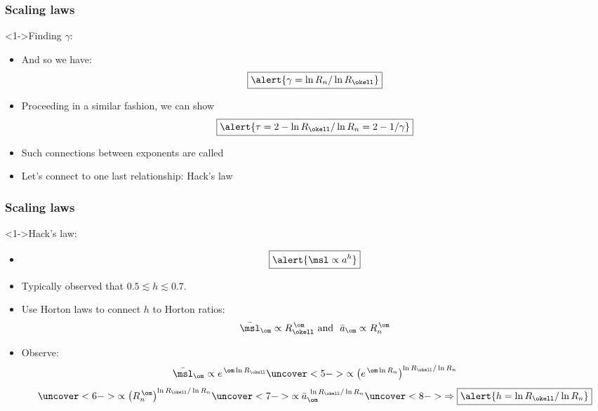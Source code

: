 \begin{frame}[label=]
  \frametitle{Scaling laws}

  \begin{block}<1->{Finding $\gamma$:}
    \begin{itemize}
    \item<1-> And so we have:
      $$
      \boxed{\alert{\gamma = \ln R_n / \ln R_\okell}}
      $$
    \item<2-> Proceeding in a similar fashion, we can
      show 
      $$
      \boxed{\alert{\tau = 2 - \ln R_\okell / \ln R_n = 2 - 1/\gamma}}
      $$
    \item<3-> Such connections between exponents are 
      called 
    \item<4-> Let's connect to one last relationship: Hack's law
    \end{itemize}
    
  \end{block}

\end{frame}

\begin{frame}[label=]
  \frametitle{Scaling laws}

  \begin{block}<1->{Hack's law:\cite{hack1957a}}
    \begin{itemize}
    \item<1-> 
      $$
      \boxed{\alert{
          \msl \propto a^{h}
        }}
      $$
    \item<2->
      Typically observed that $0.5 \lesssim h \lesssim 0.7$.
    \item<3-> Use Horton laws to connect $h$ to Horton ratios:
      $$
      \bar{\msl}_\om \propto R_\okell^{\, \om}
      \mbox{\ and \ }
      \bar{a}_\om \propto R_n^{\, \om}
      $$
    \item<4->
      Observe:
      $$
      \bar{\msl}_{\om} \propto e^{\, \om \ln R_\okell}
      \uncover<5->{
        \propto \left(e^{\, \om \ln R_n} \right)^{ \ln R_\okell / \ln R_n}
      }
      $$
      $$
      \uncover<6->{
        \propto 
        \left(
          R_n^{\, \om }
        \right)^{\ln R_\okell / \ln R_n}
      }
      \uncover<7->{
        \propto
        \bar{a}_\om^{\ \ln R_\okell / \ln R_n}
      }
      \uncover<8->{
        \Rightarrow \boxed{\alert{ h = \ln R_\okell / \ln R_n}}
      }
      $$
    \end{itemize}
  \end{block}

\end{frame}


